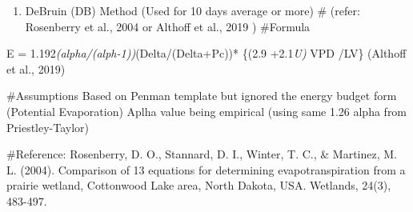 \documentclass[
]{article}
\newenvironment{Shaded}{\begin{snugshade}}{\end{snugshade}}
\newcommand{\CommentTok}[1]{\textcolor[rgb]{0.56,0.35,0.01}{\textit{#1}}}
\newcommand{\DecValTok}[1]{\textcolor[rgb]{0.00,0.00,0.81}{#1}}
\newcommand{\NormalTok}[1]{#1}
\newcommand{\OtherTok}[1]{\textcolor[rgb]{0.56,0.35,0.01}{#1}}
\newcommand{\SpecialCharTok}[1]{\textcolor[rgb]{0.00,0.00,0.00}{#1}}
\providecommand{\tightlist}{%
  \setlength{\itemsep}{0pt}\setlength{\parskip}{0pt}}
\begin{document}
\begin{Shaded}
\end{Shaded}

\begin{enumerate}
\def\labelenumi{\arabic{enumi}.}
\setcounter{enumi}{5}
\tightlist
\item
  DeBruin (DB) Method (Used for 10 days average or more) \# (refer:
  Rosenberry et al., 2004 or Althoff et al., 2019 ) \#Formula
\end{enumerate}

E = 1.192\emph{(alpha/(alph-1))}(Delta/(Delta+Pc))* \{(2.9 +2.1\emph{U)}
VPD /LV\} (Althoff et al., 2019)

\#Assumptions Based on Penman template but ignored the energy budget
form (Potential Evaporation) Aplha value being empirical (using same
1.26 alpha from Priestley-Taylor)

\#Reference: Rosenberry, D. O., Stannard, D. I., Winter, T. C., \&
Martinez, M. L. (2004). Comparison of 13 equations for determining
evapotranspiration from a prairie wetland, Cottonwood Lake area, North
Dakota, USA. Wetlands, 24(3), 483-497.
\end{document}
